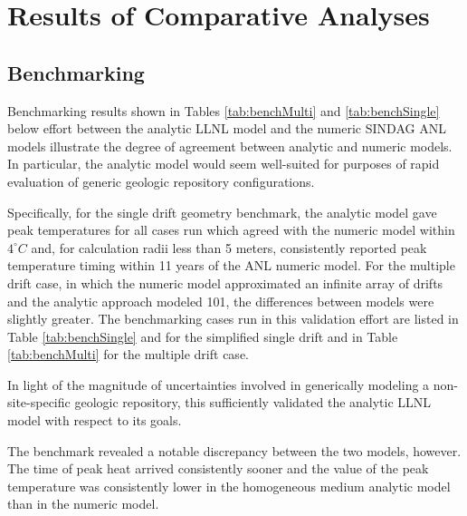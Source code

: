 \documentclass{anstrans}
\begin{document}
\section{Results of Comparative Analyses}

\subsection{Benchmarking}

Benchmarking results shown in Tables \ref{tab:benchMulti} and 
\ref{tab:benchSingle} below  effort between the analytic \gls{LLNL}
model and the numeric \gls{SINDAG} \gls{ANL} models illustrate the degree of agreement 
between analytic and numeric models. In particular, the analytic model would seem 
well-suited for purposes of rapid evaluation of generic geologic repository configurations. 

Specifically, for the single drift geometry benchmark, the 
analytic model gave peak temperatures for all cases run which agreed with the 
numeric model within $4^{\circ}C$ and, for calculation radii less than 5 meters, 
consistently reported peak temperature timing within 11 years of the \gls{ANL} 
numeric model. For the multiple drift case, in which the numeric model 
approximated an infinite array of drifts and the analytic approach modeled 101, 
the differences between models were slightly greater. The benchmarking cases run 
in this validation effort are listed in Table \ref{tab:benchSingle} and for the 
simplified single drift and in Table \ref{tab:benchMulti} for the multiple drift 
case.

In light of the magnitude of uncertainties involved in generically 
modeling a non-site-specific geologic repository, this sufficiently validated 
the analytic \gls{LLNL} model with respect to its goals.

The benchmark revealed a notable discrepancy between the two models, 
however. The time of peak heat arrived consistently sooner and the value of the 
peak temperature was consistently lower in the homogeneous medium analytic
model than in the numeric model. 
\end{document}
